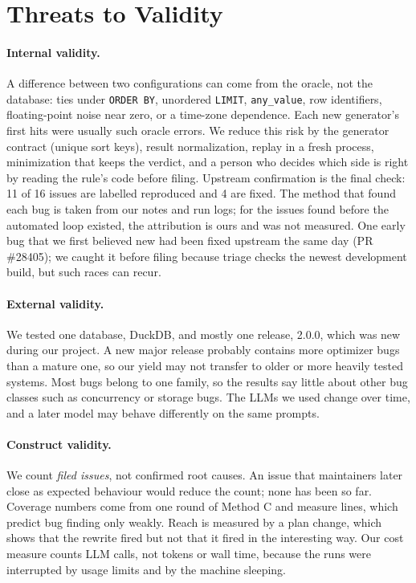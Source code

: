 \section{Threats to Validity}
\label{sec:threats}

\paragraph{Internal validity.} A difference between two configurations can come from the oracle, not the database:
ties under \texttt{ORDER BY}, unordered \texttt{LIMIT}, \texttt{any\_value}, row identifiers, floating-point noise near
zero, or a time-zone dependence. Each new generator's first hits were usually such oracle errors. We reduce this risk by
the generator contract (unique sort keys), result normalization, replay in a fresh process, minimization that keeps the
verdict, and a person who decides which side is right by reading the rule's code before filing. Upstream confirmation
is the final check: 11 of 16 issues are labelled reproduced and 4 are fixed. The method that found each bug is taken
from our notes and run logs; for the issues found before the automated loop existed, the attribution is ours and was
not measured. One early bug that we first believed new had been fixed upstream the same day (PR \#28405); we caught it
before filing because triage checks the newest development build, but such races can recur.

\paragraph{External validity.} We tested one database, DuckDB, and mostly one release, 2.0.0, which was new during
our project. A new major release probably contains more optimizer bugs than a mature one, so our yield may not transfer
to older or more heavily tested systems. Most bugs belong to one family, so the results say little about other bug
classes such as concurrency or storage bugs. The LLMs we used change over time, and a later model may behave
differently on the same prompts.

\paragraph{Construct validity.} We count \emph{filed issues}, not confirmed root causes. An issue that maintainers
later close as expected behaviour would reduce the count; none has been so far. Coverage numbers come from one round of
Method C and measure lines, which predict bug finding only weakly. Reach is measured by a plan change, which shows that
the rewrite fired but not that it fired in the interesting way. Our cost measure counts LLM calls, not tokens or wall
time, because the runs were interrupted by usage limits and by the machine sleeping.
